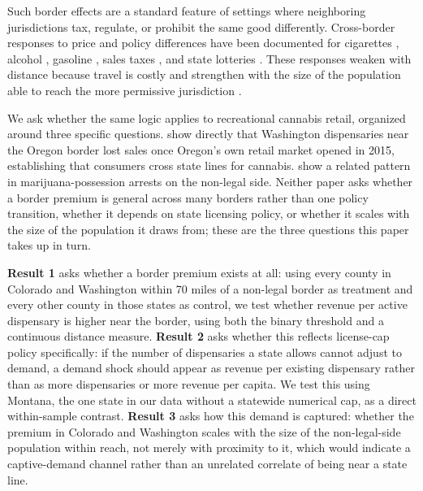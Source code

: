 \documentclass[12pt]{article}
\begin{document}
Such border effects are a standard feature of settings where neighboring jurisdictions tax, regulate, or
prohibit the same good differently. Cross-border responses to price and policy differences have been
documented for cigarettes \citep{Lovenheim2008}, alcohol \citep{AsplundFribergWilander2007,BeattyLarsenSommervoll2009,Stehr2007},
gasoline \citep{BanfiFilippiniHunt2005}, sales taxes \citep{Agrawal2015,BakerJohnsonKueng2021}, and state
lotteries \citep{KnightSchiff2012}. These responses weaken with distance because travel is costly
\citep{ChandraHeadTappata2014} and strengthen with the size of the population able to reach the more
permissive jurisdiction \citep{KnightSchiff2012,ChandraHeadTappata2014}.

We ask whether the same logic applies to recreational cannabis retail, organized around three specific
questions. \citet{HansenMillerWeber2020} show directly that Washington dispensaries near the Oregon border
lost sales once Oregon's own retail market opened in 2015, establishing that consumers cross state lines for
cannabis. \citet{HaoCowan2020} show a related pattern in marijuana-possession arrests on the non-legal side.
Neither paper asks whether a border premium is general across many borders rather than one policy transition,
whether it depends on state licensing policy, or whether it scales with the size of the population it draws
from; these are the three questions this paper takes up in turn.

\textbf{Result 1} asks whether a border premium exists at all: using every county in Colorado and Washington
within 70 miles of a non-legal border as treatment and every other county in those states as control, we
test whether revenue per active dispensary is higher near the border, using both the binary threshold and a
continuous distance measure. \textbf{Result 2} asks whether this reflects license-cap policy specifically:
if the number of dispensaries a state allows cannot adjust to demand, a demand shock should appear as revenue
per existing dispensary rather than as more dispensaries or more revenue per capita. We test this using
Montana, the one state in our data without a statewide numerical cap, as a direct within-sample contrast.
\textbf{Result 3} asks how this demand is captured: whether the premium in Colorado and Washington scales
with the size of the non-legal-side population within reach, not merely with proximity to it, which would
indicate a captive-demand channel rather than an unrelated correlate of being near a state line.
\end{document}

